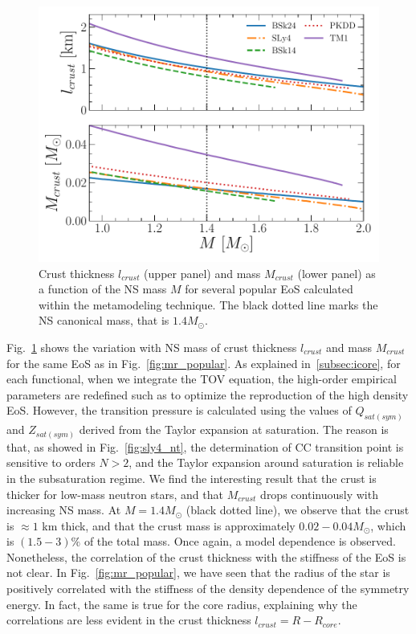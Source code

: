 \begin{figure}[!t]
\begin{center}
  \includegraphics[width=0.9\linewidth]{figures/crustmassthick.pdf}
\end{center}
\caption[Crust thickness and mass versus neutron star mass for several 
popular equations of state]{Crust 
  thickness $l_{crust}$ (upper panel) and mass $M_{crust}$ (lower panel) as a 
  function of the NS mass $M$ for several popular EoS calculated within the 
  metamodeling technique. The black dotted line marks the NS canonical mass, 
  that is $1.4M_\odot$.}\label{fig:crustmassthick}
\end{figure}

Fig.~\ref{fig:crustmassthick} shows the variation with NS mass of crust 
thickness $l_{crust}$ and mass $M_{crust}$ for the same EoS as in 
Fig.~\ref{fig:mr_popular}. As explained in~\ref{subsec:icore}, for each
functional, when we integrate the TOV equation, the high-order empirical 
parameters are redefined such as to optimize the reproduction of the
high density EoS. 
However, the transition pressure is calculated using the values of 
$Q_{sat(sym)}$ and $Z_{sat(sym)}$ derived from the Taylor expansion at 
saturation. The reason is that, as showed in Fig.~\ref{fig:sly4_nt}, the 
determination of CC transition point is sensitive to orders $N>2$, and the
Taylor expansion around saturation is reliable in the subsaturation regime. 
We find the interesting result that the crust is thicker for low-mass neutron 
stars, and that $M_{crust}$ drops continuously with 
increasing NS mass. At $M=1.4M_\odot$ (black dotted line), we 
observe that the crust is $\approx 1$ km thick, and that the crust mass is 
approximately $0.02-0.04M_\odot$, which is $(1.5-3)\%$ of the total mass. Once
again, a model dependence is observed. Nonetheless, the correlation of the 
crust thickness with the stiffness of the EoS is not clear. 
In Fig.~\ref{fig:mr_popular}, we have seen that the radius of the 
star is positively correlated with the stiffness of the density dependence of
the symmetry energy. In fact, the same is true for the 
core radius, explaining why the correlations are less evident in the crust 
thickness $l_{crust} = R - R_{core}$.


